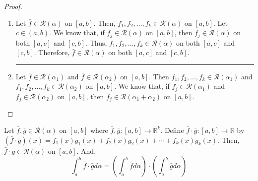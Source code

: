 \begin{commentary}
\begin{proof}
\begin{enumerate}
	\hrule \vspace{1em}
	\item
	Let $\bar{f} \in \mathscr{R}(\alpha)$ on $[a,b]$.
	Then, $f_1,f_2,\dots,f_k \in \mathscr{R}(\alpha)$ on $[a,b]$.
	Let $c \in (a,b)$.
	We know that, if $f_j \in \mathscr{R}(\alpha)$ on $[a,b]$, then $f_j \in \mathscr{R}(\alpha)$ on both $[a,c]$ and $[c,b]$.
	Thus, $f_1,f_2,\dots,f_k \in \mathscr{R}(\alpha)$ on both $[a,c]$ and $[c,b]$.
	Therefore, $\bar{f} \in \mathscr{R}(\alpha)$ on both $[a,c]$ and $[c,b]$.\\

	\hrule \vspace{1em}
	\item
	Let $\bar{f} \in \mathscr{R}(\alpha_1)$ and $\bar{f} \in \mathscr{R}(\alpha_2)$ on $[a,b]$.
	Then $f_1,f_2,\dots,f_k \in \mathscr{R}(\alpha_1)$ and $f_1,f_2,\dots,f_k \in \mathscr{R}(\alpha_2)$ on $[a,b]$.
	We know that, if $f_j \in \mathscr{R}(\alpha_1)$ and $f_j \in \mathscr{R}(\alpha_2)$ on $[a,b]$, then $f_j \in \mathscr{R}(\alpha_1+\alpha_2)$ on $[a,b]$.
\end{enumerate}
\end{proof}
\end{commentary}
\begin{challenge}
	Let $\bar{f},\bar{g} \in \mathscr{R}(\alpha)$ on $[a,b]$ where $\bar{f},\bar{g} : [a,b] \to \mathbb{R}^k$.
	Define $\bar{f} \cdot \bar{g} : [a,b] \to \mathbb{R}$ by $(\bar{f} \cdot \bar{g})(x) = f_1(x)g_1(x) + f_2(x)g_2(x) + \dotsb + f_k(x)g_k(x)$.
	Then, $\bar{f} \cdot \bar{g} \in \mathscr{R}(\alpha)$ on $[a,b]$.
	And,
	\[ \int_a^b \bar{f} \cdot \bar{g} d\alpha = \left( \int_a^b \bar{f} d\alpha \right) \cdot \left( \int_a^b \bar{g} d\alpha \right) \]
\end{challenge}


